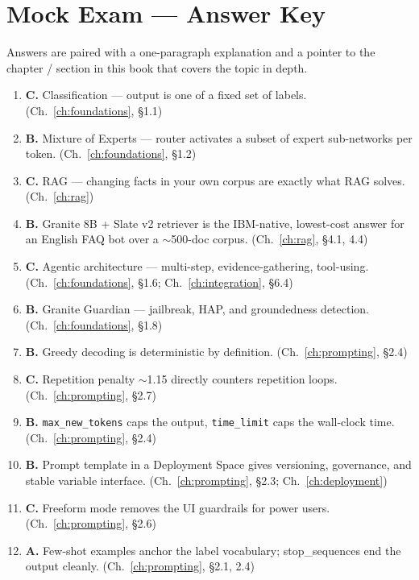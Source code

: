 \chapter{Mock Exam --- Answer Key}
\label{app:answers}

Answers are paired with a one-paragraph explanation and a pointer to the chapter / section in this book that covers the topic in depth.

\begin{enumerate}[leftmargin=*]

\item \textbf{C.} Classification --- output is one of a fixed set of labels. (Ch.\ \ref{ch:foundations}, \S 1.1)
\item \textbf{B.} Mixture of Experts --- router activates a subset of expert sub-networks per token. (Ch.\ \ref{ch:foundations}, \S 1.2)
\item \textbf{C.} RAG --- changing facts in your own corpus are exactly what RAG solves. (Ch.\ \ref{ch:rag})
\item \textbf{B.} Granite 8B + Slate v2 retriever is the IBM-native, lowest-cost answer for an English FAQ bot over a $\sim$500-doc corpus. (Ch.\ \ref{ch:rag}, \S 4.1, 4.4)
\item \textbf{C.} Agentic architecture --- multi-step, evidence-gathering, tool-using. (Ch.\ \ref{ch:foundations}, \S 1.6; Ch.\ \ref{ch:integration}, \S 6.4)
\item \textbf{B.} Granite Guardian --- jailbreak, HAP, and groundedness detection. (Ch.\ \ref{ch:foundations}, \S 1.8)
\item \textbf{B.} Greedy decoding is deterministic by definition. (Ch.\ \ref{ch:prompting}, \S 2.4)
\item \textbf{C.} Repetition penalty $\sim$1.15 directly counters repetition loops. (Ch.\ \ref{ch:prompting}, \S 2.7)
\item \textbf{B.} \texttt{max\_new\_tokens} caps the output, \texttt{time\_limit} caps the wall-clock time. (Ch.\ \ref{ch:prompting}, \S 2.4)
\item \textbf{B.} Prompt template in a Deployment Space gives versioning, governance, and stable variable interface. (Ch.\ \ref{ch:prompting}, \S 2.3; Ch.\ \ref{ch:deployment})
\item \textbf{C.} Freeform mode removes the UI guardrails for power users. (Ch.\ \ref{ch:prompting}, \S 2.6)
\item \textbf{A.} Few-shot examples anchor the label vocabulary; stop\_sequences end the output cleanly. (Ch.\ \ref{ch:prompting}, \S 2.1, 2.4)

\end{enumerate}
